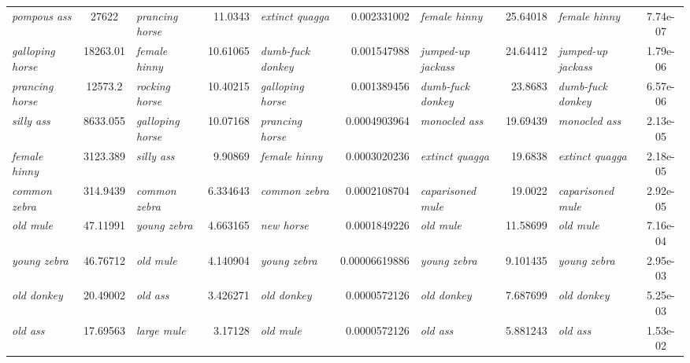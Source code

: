 \begin{sidewaystable}
{\begin{tabular}[t]{lS[table-format=5.2]lrlrlrlS[table-format=1.2e-3]}
\textit{pompous ass} & 27622 & \textit{prancing horse} & \num{11.0343} & \textit{extinct quagga} & \num[round-mode=places,round-precision=6]{0.002331002} & \textit{female hinny} & \num{25.64018} & \textit{female hinny} & 7.74e-07 \\
\textit{galloping horse} & 18263.01 & \textit{female hinny} & \num{10.61065} & \textit{dumb\hyp{}fuck donkey} & \num[round-mode=places,round-precision=6]{0.001547988} & \textit{jumped\hyp{}up jackass} & \num{24.64412} & \textit{jumped\hyp{}up jackass} & 1.79e-06 \\
\textit{prancing horse} & 12573.2 & \textit{rocking horse} & \num{10.40215} & \textit{galloping horse} & \num[round-mode=places,round-precision=6]{0.001389456} & \textit{dumb\hyp{}fuck donkey} & \num{23.8683} & \textit{dumb\hyp{}fuck donkey} & 6.57e-06 \\
\textit{silly ass} & 8633.055 & \textit{galloping horse} & \num{10.07168} & \textit{prancing horse} & \num[round-mode=places,round-precision=6]{0.0004903964} & \textit{monocled ass} & \num{19.69439} & \textit{monocled ass} & 2.13e-05 \\
\textit{female hinny} & 3123.389 & \textit{silly ass} & \num{9.90869} & \textit{female hinny} & \num[round-mode=places,round-precision=6]{0.0003020236} & \textit{extinct quagga} & \num{19.6838} & \textit{extinct quagga} & 2.18e-05 \\
\textit{common zebra} & 314.9439 & \textit{common zebra} & \num{6.334643} & \textit{common zebra} & \num[round-mode=places,round-precision=6]{0.0002108704} & \textit{caparisoned mule} & \num{19.0022} & \textit{caparisoned mule} & 2.92e-05 \\
\textit{old mule} & 47.11991 & \textit{young zebra} & \num{4.663165} & \textit{new horse} & \num[round-mode=places,round-precision=6]{0.0001849226} & \textit{old mule} & \num{11.58699} & \textit{old mule} & 7.16e-04 \\
\textit{young zebra} & 46.76712 & \textit{old mule} & \num{4.140904} & \textit{young zebra} & \num[round-mode=places,round-precision=6]{0.00006619886} & \textit{young zebra} & \num{9.101435} & \textit{young zebra} & 2.95e-03 \\
\textit{old donkey} & 20.49002 & \textit{old ass} & \num{3.426271} & \textit{old donkey} & \num[round-mode=places,round-precision=6]{0.0000572126} & \textit{old donkey} & \num{7.687699} & \textit{old donkey} & 5.25e-03 \\
\textit{old ass} & 17.69563 & \textit{large mule} & \num{3.17128} & \textit{old mule} & \num[round-mode=places,round-precision=6]{0.0000572126} & \textit{old ass} & \num{5.881243} & \textit{old ass} & 1.53e-02 \\

\end{tabular}}
\end{sidewaystable}

